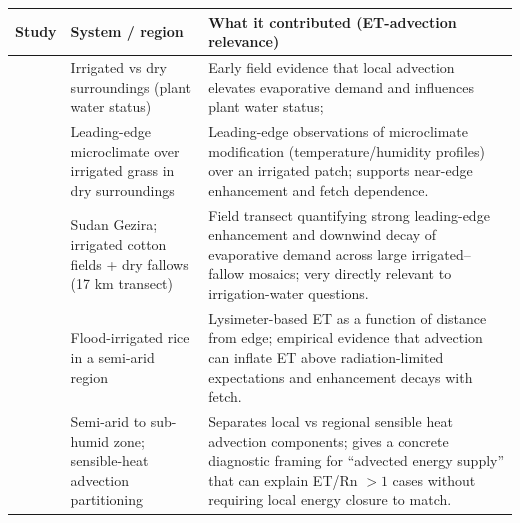 \documentclass{article}
\begin{document}
    
    \begin{table}[htbp]
    \centering
    \renewcommand{\arraystretch}{1.15}
    \label{tab:advection_edge_links}
    \begin{tabular}{|p{3.0cm}|p{4.3cm}|p{6.5cm}|}
    \hline
    \textbf{Study} & \textbf{System / region} & \textbf{What it contributed (ET-advection relevance)}  \\
    \hline

    \hline

    \citet{millar1964effect} &
    Irrigated vs dry surroundings (plant water status) &
    Early field evidence that local advection elevates evaporative demand and influences plant water status;  \\

    \hline
    \citet{dyer_observations_1965} &
    Leading-edge microclimate over irrigated grass in dry surroundings &
     Leading-edge observations of microclimate modification (temperature/humidity profiles) over an irrigated patch; 
     supports near-edge enhancement and fetch dependence. \\
    \hline

    
    \citet{davenport_local_1967} &
    Sudan Gezira; irrigated cotton fields + dry fallows (17 km transect) &
    Field transect quantifying strong leading-edge enhancement and downwind decay of evaporative demand across large irrigated–fallow mosaics; very directly relevant to irrigation-water questions.\\
    \hline

    \citet{lang1974influence} &
    Flood-irrigated rice in a semi-arid region &
    Lysimeter-based ET as a function of distance from edge;  empirical evidence that advection can inflate ET above radiation-limited expectations and enhancement decays with fetch. \\
    \hline

    \citet{brakke1978local} &
    Semi-arid to sub-humid zone; sensible-heat advection partitioning &
    Separates local vs regional sensible heat advection components; gives a concrete diagnostic framing for “advected energy supply” that can explain ET/Rn $>1$ cases without requiring local energy closure to match. \\
    \hline
    \end{tabular}
    \end{table}
\end{document}
